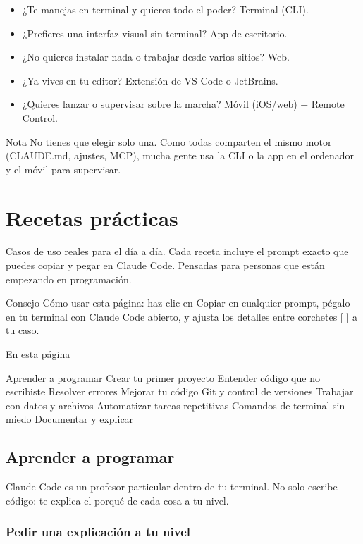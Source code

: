 \documentclass[11pt,a4paper]{report}
\begin{document}
\begin{itemize}
\item ¿Te manejas en terminal y quieres todo el poder? Terminal (CLI).
\item ¿Prefieres una interfaz visual sin terminal? App de escritorio.
\item ¿No quieres instalar nada o trabajar desde varios sitios? Web.
\item ¿Ya vives en tu editor? Extensión de VS Code o JetBrains.
\item ¿Quieres lanzar o supervisar sobre la marcha? Móvil (iOS/web) + Remote Control.
\end{itemize}

\begin{calloutbox}{Nota}
No tienes que elegir solo una. Como todas comparten el mismo motor (CLAUDE.md, ajustes, MCP), mucha gente usa la CLI o la app en el ordenador y el móvil para supervisar.\end{calloutbox}


\chapter{Recetas prácticas}

Casos de uso reales para el día a día. Cada receta incluye el prompt exacto que puedes copiar y pegar en Claude Code. Pensadas para personas que están empezando en programación.

\begin{calloutbox}{Consejo}
Cómo usar esta página: haz clic en  Copiar en cualquier prompt, pégalo en tu terminal con Claude Code abierto, y ajusta los detalles entre corchetes [ ] a tu caso.\end{calloutbox}

En esta página

 Aprender a programar Crear tu primer proyecto Entender código que no escribiste Resolver errores Mejorar tu código Git y control de versiones Trabajar con datos y archivos Automatizar tareas repetitivas Comandos de terminal sin miedo Documentar y explicar\section{ Aprender a programar}

Claude Code es un profesor particular dentro de tu terminal. No solo escribe código: te explica el porqué de cada cosa a tu nivel.

\subsection{Pedir una explicación a tu nivel}
\end{document}
